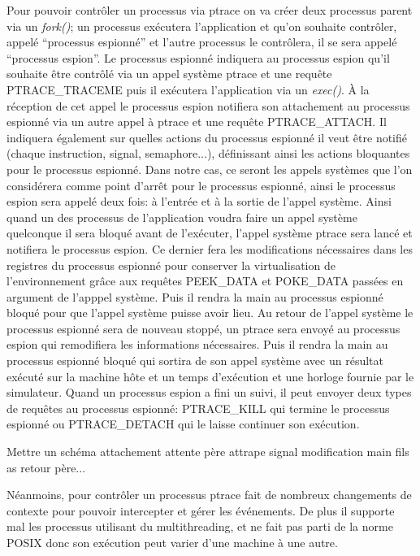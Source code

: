 Pour pouvoir contrôler un processus via ptrace on va créer deux processus parent
via un \textit{fork()}; un processus exécutera l'application et qu'on souhaite
contrôler, appelé ``processus espionné'' et l'autre processus le contrôlera, il
se sera appelé ``processus espion''. Le processus espionné indiquera au
processus espion qu'il souhaite être contrôlé via un appel système ptrace et une
requête PTRACE\_TRACEME puis il exécutera l'application via un
\textit{exec()}. À la réception de cet appel le processus espion notifiera son
attachement au processus espionné via un autre appel à ptrace et une requête
PTRACE\_ATTACH. Il indiquera également sur quelles actions du processus espionné
il veut être notifié (chaque instruction, signal, semaphore...), définissant
ainsi les actions bloquantes pour le processus espionné. Dans notre cas, ce
seront les appels systèmes que l'on considérera comme point d'arrêt pour le
processus espionné, ainsi le processus espion sera appelé deux fois: à l'entrée
et à la sortie de l'appel système. Ainsi quand un des processus de l'application
voudra faire un appel système quelconque il sera bloqué avant de l'exécuter,
l'appel système ptrace sera lancé et notifiera le processus espion. Ce dernier
fera les modifications nécessaires dans les registres du processus espionné pour
conserver la virtualisation de l'environnement grâce aux requêtes PEEK\_DATA et
POKE\_DATA passées en argument de l'apppel système. Puis il rendra la main au
processus espionné bloqué pour que l'appel système puisse avoir lieu. Au retour
de l'appel système le processus espionné sera de nouveau stoppé, un ptrace sera
envoyé au processus espion qui remodifiera les informations nécessaires. Puis il
rendra la main au processus espionné bloqué qui sortira de son appel système
avec un résultat exécuté sur la machine hôte et un temps d'exécution et une
horloge fournie par le simulateur. Quand un processus espion a fini un suivi, il
peut envoyer deux types de requêtes au processus espionné: PTRACE\_KILL qui
termine le processus espionné ou PTRACE\_DETACH qui le laisse continuer son
exécution.

{\color{red} Mettre un schéma attachement attente père attrape signal
  modification main fils as retour père...}

Néanmoins, pour contrôler un processus ptrace fait de nombreux changements de
contexte pour pouvoir intercepter et gérer les événements. De plus il supporte
mal les processus utilisant du multithreading, et ne fait pas parti de la norme
POSIX donc son exécution peut varier d'une machine à une autre.

